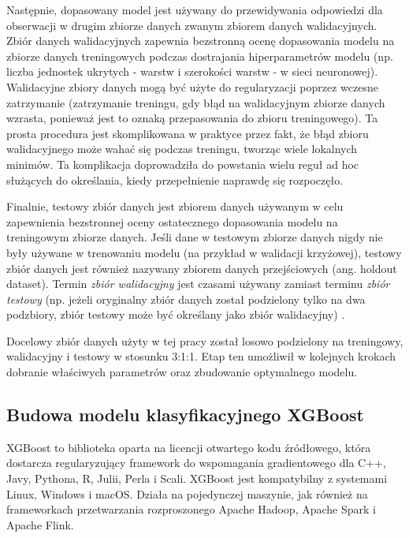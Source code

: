 \documentclass[polish, twoside, 12pt, a4paper]{article}
\theoremstyle{definition}
\theoremstyle{plain}
\theoremstyle{remark}
\begin{document}
Następnie, dopasowany model jest używany do przewidywania odpowiedzi dla obserwacji w drugim zbiorze danych zwanym zbiorem danych walidacyjnych. Zbiór danych walidacyjnych zapewnia bezstronną ocenę dopasowania modelu na zbiorze danych treningowych podczas dostrajania hiperparametrów modelu (np. liczba jednostek ukrytych - warstw i szerokości warstw - w sieci neuronowej). Walidacyjne zbiory danych mogą być użyte do regularyzacji poprzez wczesne zatrzymanie (zatrzymanie treningu, gdy błąd na walidacyjnym zbiorze danych wzrasta, ponieważ jest to oznaką przepasowania do zbioru treningowego). Ta prosta procedura jest skomplikowana w praktyce przez fakt, że błąd zbioru walidacyjnego może wahać się podczas treningu, tworząc wiele lokalnych minimów. Ta komplikacja doprowadziła do powstania wielu reguł ad hoc służących do określania, kiedy przepełnienie naprawdę się rozpoczęło.

Finalnie, testowy zbiór danych jest zbiorem danych używanym w celu zapewnienia bezstronnej oceny ostatecznego dopasowania modelu na treningowym zbiorze danych. Jeśli dane w testowym zbiorze danych nigdy nie były używane w trenowaniu modelu (na przykład w walidacji krzyżowej), testowy zbiór danych jest również nazywany zbiorem danych przejściowych (ang. holdout dataset). Termin \emph{zbiór walidacyjny} jest czasami używany zamiast terminu \emph{zbiór testowy} (np. jeżeli oryginalny zbiór danych został podzielony tylko na dwa podzbiory, zbiór testowy może być określany jako zbiór walidacyjny) \cite{brownlee2017}.

Docelowy zbiór danych użyty w tej pracy został losowo podzielony na treningowy, walidacyjny i testowy w stosunku 3:1:1. Etap ten umożliwił w kolejnych krokach dobranie właściwych parametrów oraz zbudowanie optymalnego modelu.

\subsection{Budowa modelu klasyfikacyjnego XGBoost}

XGBoost to biblioteka oparta na licencji otwartego kodu źródłowego, która dostarcza regularyzujący framework do wspomagania gradientowego dla C++, Javy, Pythona, R, Julii, Perla i Scali. XGBoost jest kompatybilny z systemami Linux, Windows i macOS. Działa na pojedynczej maszynie, jak również na frameworkach przetwarzania rozproszonego Apache Hadoop, Apache Spark i Apache Flink. 
\end{document}
